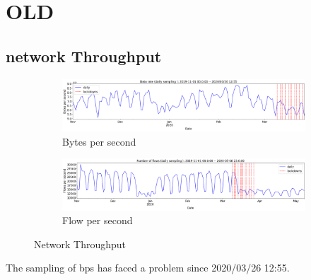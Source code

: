 \documentclass[10pt, journal, letterpaper]{IEEEtran}
\newcommand\linearFigSze{0.48}
\begin{document}
\section{OLD}
\subsection{network Throughput}


\begin{figure}
    \begin{subfigure}{\linearFigSze\textwidth}
          \centering
          \includegraphics[width=\columnwidth]{img/traffic_trend_bps.png}
          \caption{Bytes per second}
          \label{fig:traffic_trend_bps}
    \end{subfigure}
    \begin{subfigure}{\linearFigSze\textwidth}
          \centering
          \includegraphics[width=\columnwidth]{img/traffic_trend_fps.png}
          \caption{Flow per second}
          \label{fig:traffic_trend_fps}
    \end{subfigure}
    \caption{Network Throughput}
    \label{fig:network_throughput}
\end{figure}

The sampling of bps has faced a problem since 2020/03/26 12:55. 
\end{document}
